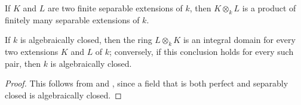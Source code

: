 \begin{corollary}[4.3.8]
\label{IV.4.3.8}
If $K$ and $L$ are two finite separable extensions of $k$, then
$K\otimes_k L$ is a product of finitely many separable extensions of
$k$.
\end{corollary}


\begin{proposition}[4.3.9]
\label{IV.4.3.9}
If $k$ is algebraically closed, then the ring $L\otimes_k K$ is an
integral domain for every two extensions $K$ and $L$ of $k$; conversely,
if this conclusion holds for every such pair, then $k$ is algebraically
closed.
\end{proposition}

\begin{proof}
This follows from  and , since a field
that is both perfect and separably closed is algebraically closed.
\end{proof}
